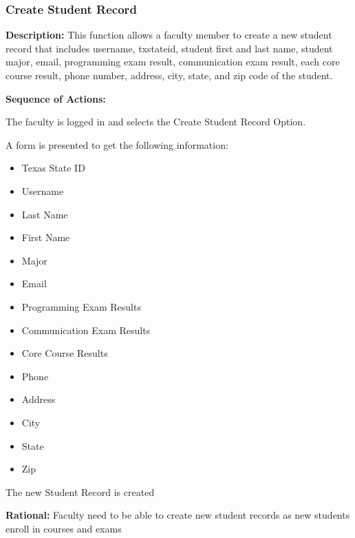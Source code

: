    \subsubsection{\large Create Student Record} 
   \begin{boxed} %
      \textbf{Description:}
      {\small This function allows a faculty member to create a new student
         record that includes username, txstateid, student first and last name,
         student major, email, programming exam result, communication exam
         result, each core course result, phone number, address, city, state,
         and zip code of the student.}
         
         \textbf{Sequence of Actions:}
         \begin{enumerate}
               {\small
            \item The faculty is logged in and selects the Create Student Record
               Option.
            \item A form is presented to get the following information:
               \begin{itemize}
                  \item Texas State ID
                  \item Username
                  \item Last Name
                  \item First Name
                  \item Major
                  \item Email
                  \item Programming Exam Results
                  \item Communication Exam Results
                  \item Core Course Results
                  \item Phone
                  \item Address
                  \item City
                  \item State
                  \item Zip
               \end{itemize}
            \item The new Student Record is created}
      \end{enumerate}

         \textbf{Rational:}
         {\small Faculty need to be able to create new student records as new students
         enroll in courses and exams}
   \end{boxed} %

